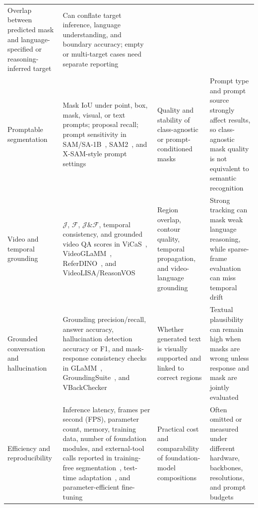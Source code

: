 \begin{table}[t]
\begin{tabularx}{\textwidth}{>{\raggedright\arraybackslash}p{}>{\raggedright\arraybackslash}X>{\raggedright\arraybackslash}p{}>{\raggedright\arraybackslash}p{}}
Overlap between predicted mask and language-specified or reasoning-inferred target &
Can conflate target inference, language understanding, and boundary accuracy; empty or multi-target cases need separate reporting \\
Promptable segmentation &
Mask IoU under point, box, mask, visual, or text prompts; proposal recall; prompt sensitivity in SAM/SA-1B~\citep{kirillov2023sam}, SAM2~\citep{ravi2024sam2}, and X-SAM-style prompt settings~\citep{hwangXSAMSegmentAnything2026} &
Quality and stability of class-agnostic or prompt-conditioned masks &
Prompt type and prompt source strongly affect results, so class-agnostic mask quality is not equivalent to semantic recognition \\
Video and temporal grounding &
$\mathcal{J}$, $\mathcal{F}$, $\mathcal{J}\&\mathcal{F}$, temporal consistency, and grounded video QA scores in ViCaS~\citep{atharVicasDatasetCombining2025}, VideoGLaMM~\citep{munasingheVideoglammLargeMultimodal2025}, ReferDINO~\citep{liangReferdinoReferringVideo2025}, and VideoLISA/ReasonVOS~\citep{baiOneTokenSeg2024} &
Region overlap, contour quality, temporal propagation, and video-language grounding &
Strong tracking can mask weak language reasoning, while sparse-frame evaluation can miss temporal drift \\
Grounded conversation and hallucination &
Grounding precision/recall, answer accuracy, hallucination detection accuracy or F1, and mask-response consistency checks in GLaMM~\citep{rasheedGlammPixelGrounding2024}, GroundingSuite~\citep{huGroundingSuiteMeasuringComplex2025}, and VBackChecker~\citep{guoSeeingBelievingRichContext2026} &
Whether generated text is visually supported and linked to correct regions &
Textual plausibility can remain high when masks are wrong unless response and mask are jointly evaluated \\
Efficiency and reproducibility &
Inference latency, frames per second (FPS), parameter count, memory, training data, number of foundation modules, and external-tool calls reported in training-free segmentation~\citep{shiyHarnessingVisionFoundation2025}, test-time adaptation~\citep{noorimTesttimeAdaptationVisionlanguage2026}, and parameter-efficient fine-tuning~\citep{zpengParameterefficientFinetuningHyperspherical2025} &
Practical cost and comparability of foundation-model compositions &
Often omitted or measured under different hardware, backbones, resolutions, and prompt budgets \\
\bottomrule
\end{tabularx}
\end{table}


